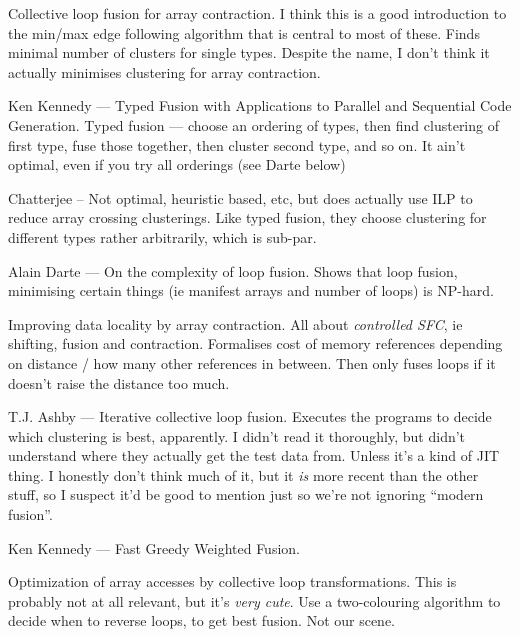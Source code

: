 \cite{gao1993collective} Collective loop fusion for array contraction.
I think this is a good introduction to the min/max edge following algorithm that is central to most of these.
Finds minimal number of clusters for single types. Despite the name, I don't think it actually minimises clustering for array contraction.

\cite{kennedy1993typedfusion} Ken Kennedy --- Typed Fusion with Applications to Parallel and Sequential Code Generation.
Typed fusion --- choose an ordering of types, then find clustering of first type, fuse those together, then cluster second type, and so on.
It ain't optimal, even if you try all orderings (see Darte below)

\cite{chatterjee1991size} Chatterjee -- Not optimal, heuristic based, etc, but does actually use ILP to reduce array crossing clusterings. Like typed fusion, they choose clustering for different types rather arbitrarily, which is sub-par.

\cite{darte1999complexity} Alain Darte --- On the complexity of loop fusion.
Shows that loop fusion, minimising certain things (ie manifest arrays and number of loops) is NP-hard.

\cite{song2004improving} Improving data locality by array contraction.
All about \emph{controlled SFC}, ie shifting, fusion and contraction.
Formalises cost of memory references depending on distance / how many other references in between. Then only fuses loops if it doesn't raise the distance too much.

\cite{ashby2006iterative} T.J. Ashby --- Iterative collective loop fusion.
Executes the programs to decide which clustering is best, apparently. I didn't read it thoroughly, but didn't understand where they actually get the test data from. Unless it's a kind of JIT thing.
I honestly don't think much of it, but it \emph{is} more recent than the other stuff, so I suspect it'd be good to mention just so we're not ignoring ``modern fusion''.

\cite{kennedy2001fastgreedy} Ken Kennedy --- Fast Greedy Weighted Fusion.

\cite{sarkar1991optimization} Optimization of array accesses by collective loop transformations. This is probably not at all relevant, but it's \emph{very cute}. Use a two-colouring algorithm to decide when to reverse loops, to get best fusion. Not our scene.


